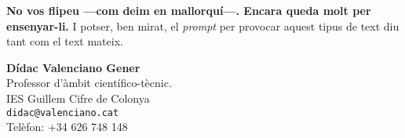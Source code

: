 \documentclass[12pt,a4paper]{article}
\begin{document}
	\textbf{No vos flipeu —com deim en mallorquí—. Encara queda molt per ensenyar-li.}
	I potser, ben mirat, el \emph{prompt} per provocar aquest tipus de text diu tant com el text mateix.
	
	\bigskip
	
	\noindent
	\textbf{Dídac Valenciano Gener}  \\
	Professor d’àmbit científico-tècnic.\\
	IES Guillem Cifre de Colonya\\
	\texttt{didac@valenciano.cat} \\
	Telèfon: +34 626 748 148
\end{document}
